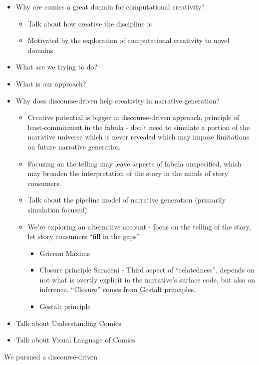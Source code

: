 \begin{itemize}
	\item Why are comics a great domain for computational creativity?
	\begin{itemize}
		\item Talk about how creative the discipline is
		\item Motivated by the exploration of computational creativity to novel domains
	\end{itemize}
	\item What are we trying to do?
	\item What is our approach?
	\item Why does discourse-driven help creativity in narrative generation?
		\begin{itemize}
			\item Creative potential is bigger in discourse-driven approach, principle 
			of least-commitment in the fabula - don't need to simulate a portion of 
			the narrative universe which is never revealed which may impose limitations
			on future narrative generation. 
			
			\item Focusing on the telling may leave aspects of fabula unspecified, which 
			may broaden the interpretation of the story in the minds of story consumers. 
			\item Talk about the pipeline model of narrative generation (primarily
				simulation focused)
			\item We're exploring an alternative account - focus on the telling of the 
				story, let story consumers ``fill in the gaps''
		
			\begin{itemize}
				\item Gricean Maxims
				\item Closure principle Saraceni - Third aspect of ``relatedness'', 
				depends on not what is overtly explicit in the narrative's surface 
				code, but also on inference.  ``Closure'' comes from Gestalt principles.
				\item Gestalt principle 
			\end{itemize}	
		\end{itemize}

	
	\item Talk about Understanding Comics~\cite{mcCloud1993understanding}
	\item Talk about Visual Language of Comics~\cite{cohn2013visual}
\end{itemize}

We pursued a discourse-driven 


